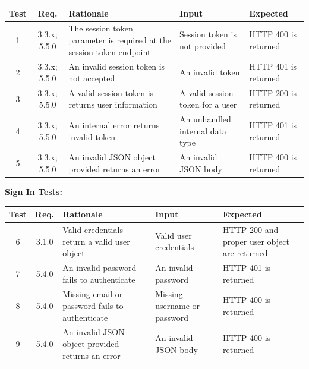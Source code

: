 \documentclass[12pt]{article}
\begin{document}
\setlength{\tabcolsep}{3mm}
\begin{tabular}{|c|c|p{5cm}|p{3cm}|p{3cm}|}
    \hline
    Test & Req.         & Rationale                                                             & Input                            & Expected             \\

    \hline
    1    & 3.3.x; 5.5.0 & The session token parameter is required at the session token endpoint & Session token is not provided    & HTTP 400 is returned \\
    \hline
    2    & 3.3.x; 5.5.0 & An invalid session token is not accepted                              & An invalid token                 & HTTP 401 is returned \\
    \hline
    3    & 3.3.x; 5.5.0 & A valid session token is returns user information                     & A valid session token for a user & HTTP 200 is returned \\
    \hline
    4    & 3.3.x; 5.5.0 & An internal error returns invalid token                               & An unhandled internal data type  & HTTP 401 is returned \\
    \hline
    5    & 3.3.x; 5.5.0 & An invalid JSON object provided returns an error                      & An invalid JSON body             & HTTP 400 is returned \\
    \hline
\end{tabular}

\textbf{Sign In Tests:}

\setlength{\tabcolsep}{3mm}
\begin{tabular}{|c|c|p{5cm}|p{3cm}|p{3cm}|}
    \hline
    Test & Req.  & Rationale                                        & Input                        & Expected                                     \\

    \hline
    6    & 3.1.0 & Valid credentials return a valid user object     & Valid user credentials       & HTTP 200 and proper user object are returned \\
    \hline
    7    & 5.4.0 & An invalid password fails to authenticate        & An invalid password          & HTTP 401 is returned                         \\
    \hline
    8    & 5.4.0 & Missing email or password fails to authenticate  & Missing username or password & HTTP 400 is returned                         \\
    \hline
    9    & 5.4.0 & An invalid JSON object provided returns an error & An invalid JSON body         & HTTP 400 is returned                         \\
    \hline
\end{tabular}
\end{document}
